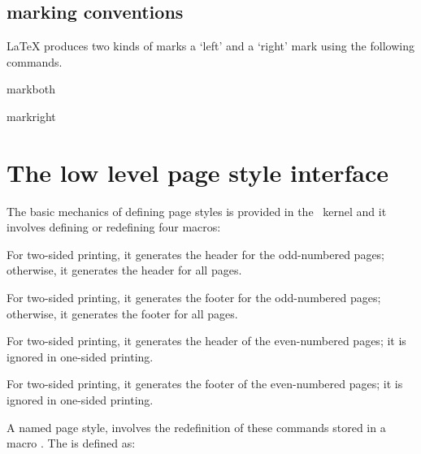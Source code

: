 \subsection{marking conventions}

LaTeX produces two kinds of marks a `left' and a `right' mark using the following commands.

markboth

markright



\section{The low level page style interface}

The basic mechanics of defining page styles is provided in the \LaTeXe\ kernel and it  involves defining or redefining four macros:

\begin{marglist}
\item [\cs{oddhead}] For two-sided printing, it generates the header for the odd-numbered
pages; otherwise, it generates the header for all pages.

\item [\cs{oddfoot}] For two-sided printing, it generates the footer for the odd-numbered pages; otherwise, it generates the footer for all pages.

\item [\cs{evenhead}] For two-sided printing, it generates the header of the even-numbered
pages; it is ignored in one-sided printing.

\item [\cs{evenfoot}] For two-sided printing, it generates the footer of the even-numbered
pages; it is ignored in one-sided printing.

\end{marglist}
A named page style, involves the redefinition of these commands stored in a macro .
The  is defined as:




